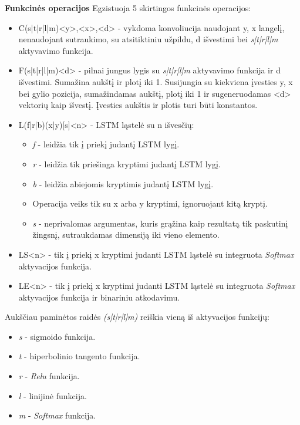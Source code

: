 \documentclass{VUMIFInfBakalaurinis}
\begin{document}
\textbf{Funkcinės operacijos}
Egzistuoja 5 skirtingos funkcinės operacijos:

\begin{itemize}
  \item C(s|t|r|l|m)<y>,<x>,<d> - vykdoma konvoliucija naudojant y, x langelį, nenaudojant sutraukimo, su atsitiktiniu užpildu, d išvestimi bei \textit{s|t|r|l|m} aktyvavimo funkcija.
  \item F(s|t|r|l|m)<d> - pilnai jungus lygis su \textit{s|t|r|l|m} aktyvavimo funkcija ir d išvestimi.
  Sumažina aukštį ir plotį iki 1. Susijungia su kiekviena įvesties y, x bei gylio pozicija, sumažindamas aukštį, plotį iki 1 ir sugeneruodamas <d> vektorių kaip išvestį.
  Įvesties aukštis ir plotis turi būti konstantos.
  \item L(f|r|b)(x|y)[s]<n> - LSTM ląstelė su n išvesčių:
  \begin{itemize}
    \item \textit{f} - leidžia tik į priekį judantį LSTM lygį.
    \item \textit{r} - leidžia tik priešinga kryptimi judantį LSTM lygį.
    \item \textit{b} - leidžia abiejomis kryptimis judantį LSTM lygį.
    \item Operacija veiks tik su x arba y kryptimi, ignoruojant kitą kryptį.
    \item \textit{s} - neprivalomas argumentas, kuris grąžina kaip rezultatą tik paskutinį žingsnį, sutraukdamas dimensiją iki vieno elemento.
  \end{itemize}
  \item LS<n> - tik į priekį x kryptimi judanti LSTM ląstelė su integruota \textit{Softmax} aktyvacijos funkcija.
  \item LE<n> - tik į priekį x kryptimi judanti LSTM ląstelė su integruota \textit{Softmax} aktyvacijos funkcija ir binariniu atkodavimu.
\end{itemize}

Aukščiau paminėtos raidės \textit{(s|t|r|l|m)} reiškia vieną iš aktyvacijos funkcijų:

\begin{itemize}
  \item \textit{s} - sigmoido funkcija.
  \item \textit{t} - hiperbolinio tangento funkcija.
  \item \textit{r} - \textit{Relu} funkcija.
  \item \textit{l} - linijinė funkcija.
  \item \textit{m} - \textit{Softmax} funkcija.
\end{itemize}
\end{document}

